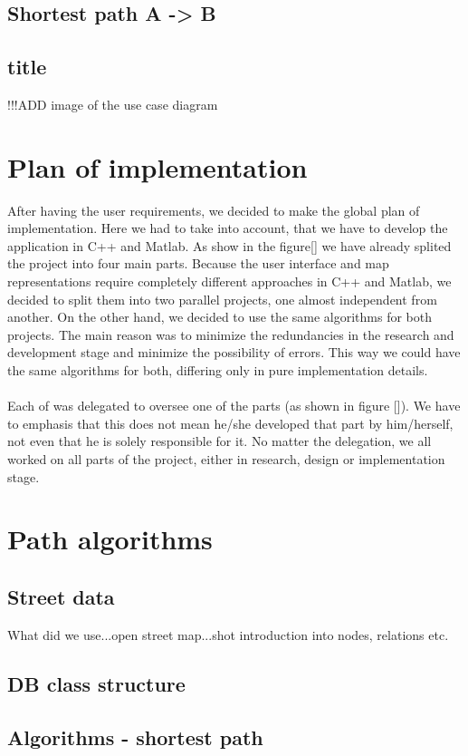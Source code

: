 \documentclass[reqno,openany,12pt]{amsbook}
\theoremstyle{definition}
\theoremstyle{remark}
\begin{document}
\section{Shortest path A -> B}
\section{title}
!!!ADD image of the use case diagram
\chapter{Plan of implementation}
After having the user requirements, we decided to make the global plan of implementation. Here we had to take into account, that we have to develop the application in C++ and Matlab. As show in the figure[] we have already splited  the project into four main parts. Because the user interface and map representations require completely different approaches in C++ and Matlab, we decided to split them into two parallel projects, one almost independent from another. On the other hand, we decided to use the same algorithms for both projects. The main reason was to minimize the redundancies in the research and development stage and minimize the possibility of errors. This way we could have the same algorithms for both, differing only in pure implementation details. \\
\\ Each of was delegated to oversee one of the parts (as shown in figure []). We have to emphasis that this does not mean he/she developed that part by him/herself, not even that he is solely responsible for it. No matter the delegation, we all worked on all parts of the project, either in research, design or implementation stage.



\chapter{Path algorithms}
\section{Street data}
What did we use...open street map...shot introduction into nodes, relations etc.
\section{DB class structure}
\section{Algorithms - shortest path}
\end{document}
